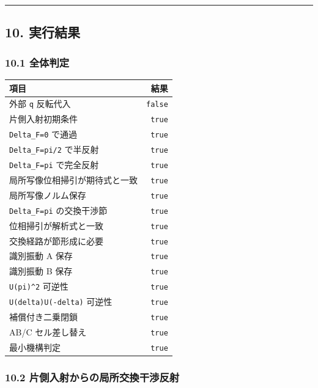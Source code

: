 \documentclass[
  a4paper,
]{article}
\newcounter{none} %
\begin{document}
\begin{center}\rule{0.5\linewidth}{0.5pt}\end{center}

\subsection{10. 実行結果}\label{ux5b9fux884cux7d50ux679c}

\subsubsection{10.1 全体判定}\label{ux5168ux4f53ux5224ux5b9a}

{\def\LTcaptype{none} %
\begin{longtable}[]{@{}lr@{}}
\toprule\noalign{}
項目 & 結果 \\
\midrule\noalign{}
\endhead
\bottomrule\noalign{}
\endlastfoot
外部 \texttt{q} 反転代入 & \texttt{false} \\
片側入射初期条件 & \texttt{true} \\
\texttt{Delta\_F=0} で通過 & \texttt{true} \\
\texttt{Delta\_F=pi/2} で半反射 & \texttt{true} \\
\texttt{Delta\_F=pi} で完全反射 & \texttt{true} \\
局所写像位相掃引が期待式と一致 & \texttt{true} \\
局所写像ノルム保存 & \texttt{true} \\
\texttt{Delta\_F=pi} の交換干渉節 & \texttt{true} \\
位相掃引が解析式と一致 & \texttt{true} \\
交換経路が節形成に必要 & \texttt{true} \\
識別振動 A 保存 & \texttt{true} \\
識別振動 B 保存 & \texttt{true} \\
\texttt{U(pi)\^{}2} 可逆性 & \texttt{true} \\
\texttt{U(delta)U(-delta)} 可逆性 & \texttt{true} \\
補償付き二乗閉鎖 & \texttt{true} \\
AB/C セル差し替え & \texttt{true} \\
最小機構判定 & \texttt{true} \\
\end{longtable}
}

\subsubsection{10.2
片側入射からの局所交換干渉反射}\label{ux7247ux5074ux5165ux5c04ux304bux3089ux306eux5c40ux6240ux4ea4ux63dbux5e72ux6e09ux53cdux5c04}
\end{document}
